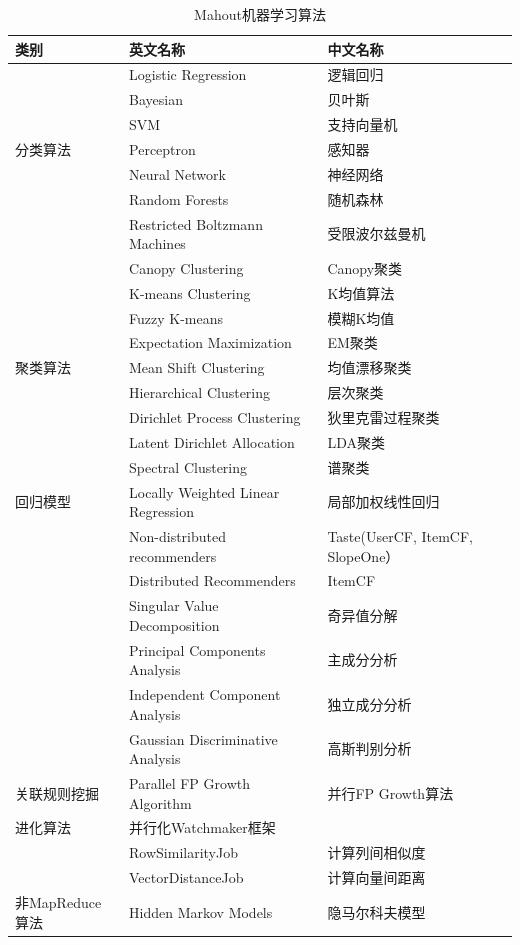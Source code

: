 \begin{table}[ht]\caption{Mahout机器学习算法}
\centering
    \begin{tabular}{l|l|l}
        \hline\hline
        类别 & 英文名称 & 中文名称\\
        \hline
        & Logistic Regression & 逻辑回归\\[0.5ex]
        & Bayesian & 贝叶斯\\[0.5ex]
        & SVM & 支持向量机\\[0.5ex]
        分类算法 & Perceptron & 感知器\\[0.5ex]
        & Neural Network & 神经网络\\[0.5ex]
        & Random Forests & 随机森林\\[0.5ex]
        & Restricted Boltzmann Machines & 受限波尔兹曼机\\[1ex]
        \hline
        & Canopy Clustering & Canopy聚类\\[0.5ex]
        & K-means Clustering & K均值算法\\[0.5ex]
        & Fuzzy K-means & 模糊K均值\\[0.5ex]
        & Expectation Maximization & EM聚类\\[0.5ex]
        聚类算法 & Mean Shift Clustering & 均值漂移聚类\\[0.5ex]
        & Hierarchical Clustering & 层次聚类\\[0.5ex]
        & Dirichlet Process Clustering & 狄里克雷过程聚类\\[0.5ex]
        & Latent Dirichlet Allocation & LDA聚类\\[0.5ex]
        & Spectral Clustering & 谱聚类\\[1ex]
        \hline
        回归模型 & Locally Weighted Linear Regression & 局部加权线性回归\\[1ex]
        \hline
        & Non-distributed recommenders & Taste(UserCF, ItemCF, SlopeOne）\\[0.5ex]
        \raisebox{1ex}{推荐算法} & Distributed Recommenders & ItemCF\\[1ex]
        \hline
        & Singular Value Decomposition & 奇异值分解\\[0.5ex]
        & Principal Components Analysis & 主成分分析\\[0.5ex]
        \raisebox{1ex}{维数约减} & Independent Component Analysis & 独立成分分析\\[0.5ex]
        & Gaussian Discriminative Analysis & 高斯判别分析\\[1ex]
        \hline
        关联规则挖掘 & Parallel FP Growth Algorithm & 并行FP Growth算法\\[1ex]
        \hline
        进化算法 & 并行化Watchmaker框架 &\\[1ex]
        \hline
        & RowSimilarityJob & 计算列间相似度\\[0.5ex]
        \raisebox{1ex}{向量相似度计算} & VectorDistanceJob & 计算向量间距离\\[1ex]
        \hline
        非MapReduce算法 & Hidden Markov Models & 隐马尔科夫模型\\[0.5ex]
        \hline
    \end{tabular}\label{tbl:mahout}
\end{table}
